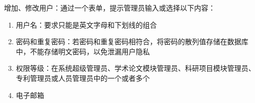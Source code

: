 增加、修改用户：通过一个表单，提示管理员输入或选择以下内容：

\begin{enumerate}
\item 用户名：要求只能是英文字母和下划线的组合
\item 密码和重复密码：若密码和重复密码相符合，将密码的散列值存储在数据库中，不能存储明文密码，以免泄漏用户隐私
\item 权限等级：在系统超级管理员、学术论文模块管理员、科研项目模块管理员、专利管理员或人员管理员中的一个或者多个
\item 电子邮箱
\end{enumerate}

